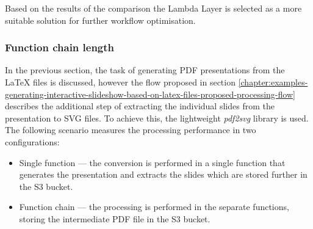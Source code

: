 Based on the results of the comparison the Lambda Layer is selected as a more suitable solution for further workflow optimisation.

\subsubsection{Function chain length}

In the previous section, the task of generating PDF presentations from the LaTeX files is discussed, however the flow proposed in section \ref{chapter:examples-generating-interactive-slideshow-based-on-latex-files-proposed-processing-flow} describes the additional step of extracting the individual slides from the presentation to SVG files. To achieve this, the lightweight \textit{pdf2svg} \cite{pdf2svg} library is used. The following scenario measures the processing performance in two configurations:

\begin{itemize}
   \item Single function --- the conversion is performed in a single function that generates the presentation and extracts the slides which are stored further in the S3 bucket.
   \item Function chain --- the processing is performed in the separate functions, storing the intermediate PDF file in the S3 bucket.
\end{itemize}

\datasetChainVsSingle

